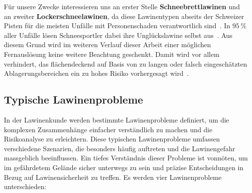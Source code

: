 Für unsere Zwecke interessieren uns an erster Stelle \textbf{Schneebrettlawinen} und an zweiter \textbf{Lockerschneelawinen}, da diese Lawinentypen abseits der Schweizer Pisten für die meisten Unfälle mit Personenschaden  verantwortlich sind~\cite{harveyrhynerschweizerlawinenkunde}.
In $\qty{95}{\percent}$ aller Unfälle lösen Schneesportler dabei ihre Unglückslawine selbst aus~\cite{ortovoxlabsnow}. Aus diesem Grund wird im weiteren Verlauf dieser Arbeit einer möglichen Fernauslösung keine weitere Beachtung geschenkt. Damit wird vor allem verhindert, das flächendeckend auf Basis von zu langen oder falsch eingeschätzten Ablagerungsbereichen ein zu hohes Risiko vorhergesagt wird~\cite{athmaps}.

\pagebreak
\subsection{Typische Lawinenprobleme}\label{lawinenprobleme}

In der Lawinenkunde werden bestimmte Lawinenprobleme definiert, um die komplexen Zusammenhänge einfacher verständlich zu machen und die Risikoanalyse zu erleichtern. Diese typischen Lawinenprobleme umfassen verschiedene Szenarien, die besonders häufig auftreten und die Lawinengefahr massgeblich beeinflussen. Ein tiefes Verständnis dieser Probleme ist vonnöten, um im gefährdetem Gelände sicher unterwegs zu sein und präzise Entscheidungen in Bezug auf Lawinensicherheit zu treffen. Es werden vier Lawinenprobleme unterschieden:

